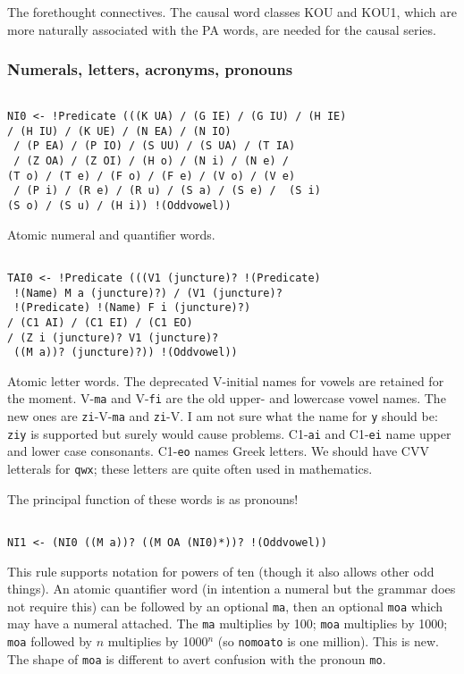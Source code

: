 \documentclass[12pt]{article}
\begin{document}
The forethought connectives.  The causal word classes KOU and KOU1, which are more naturally associated with the PA words,  are needed for the causal series.

\subsubsection{Numerals, letters, acronyms, pronouns}

\begin{verbatim}

NI0 <- !Predicate (((K UA) / (G IE) / (G IU) / (H IE) 
/ (H IU) / (K UE) / (N EA) / (N IO)
 / (P EA) / (P IO) / (S UU) / (S UA) / (T IA)
 / (Z OA) / (Z OI) / (H o) / (N i) / (N e) / 
(T o) / (T e) / (F o) / (F e) / (V o) / (V e)
 / (P i) / (R e) / (R u) / (S a) / (S e) /  (S i)
(S o) / (S u) / (H i)) !(Oddvowel))

\end{verbatim}

Atomic numeral and quantifier words.

\begin{verbatim}

TAI0 <- !Predicate (((V1 (juncture)? !(Predicate)
 !(Name) M a (juncture)?) / (V1 (juncture)?
 !(Predicate) !(Name) F i (juncture)?) 
/ (C1 AI) / (C1 EI) / (C1 EO) 
/ (Z i (juncture)? V1 (juncture)?
 ((M a))? (juncture)?)) !(Oddvowel))

\end{verbatim}

Atomic letter words.  The deprecated V-initial names for vowels are retained for the moment.  V-{\tt ma} and V-{\tt fi}
are the old upper- and lowercase vowel names.  The new ones are {\tt zi}-V-{\tt ma} and {\tt zi}-V.  I am not sure what the name for {\tt y} should be:  {\tt ziy} is supported but surely would cause problems.    C1-{\tt ai} and C1-{\tt ei} name upper and lower case consonants.  C1-{\tt eo} names Greek letters.  We should have CVV letterals for {\tt qwx}; these letters are quite often used in mathematics.

The principal function of these words is as pronouns!

\begin{verbatim}

NI1 <- (NI0 ((M a))? ((M OA (NI0)*))? !(Oddvowel))

\end{verbatim}

This rule supports notation for powers of ten (though it also allows other odd things).  An atomic quantifier word
(in intention a numeral but the grammar does not require this) can be followed by an optional {\tt ma},
then an optional {\tt moa} which may have a numeral attached.  The {\tt ma} multiplies by 100; {\tt moa} multiplies by 1000; {\tt moa} followed by $n$ multiplies by 1000$^n$ (so {\tt nomoato} is one million).  This is new.  The shape of {\tt moa} is different to avert confusion with the pronoun {\tt mo}.
\end{document}

